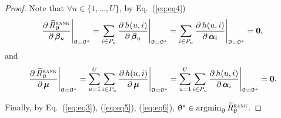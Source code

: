 \begin{proof}
Note that $\forall u \in \{1,\dots,U\}$,
by Eq.~(\ref{eq:eq4})
\begin{equation}
\label{eq:eq5}
\frac{\partial \, \widetilde R_{\uptheta}^{\textsc{rank}}} {\partial \, {\bm{\beta}}_u} \Bigg|_{\uptheta = \uptheta^*} 
= \sum_{i \in P_u} \frac{\partial \, h(u, i)}{\partial \, {\bm{\beta}}_u}  \Bigg|_{\uptheta = \uptheta^*}
= \sum_{i \in P_u} \frac{\partial \, h(u, i)}{\partial \, {\bm{\alpha}}_i} \Bigg|_{\uptheta = \uptheta^*}
= \mathbf{0},
\end{equation}
and
\begin{equation}
\label{eq:eq6}
\frac{\partial \, \widetilde R_{\uptheta}^{\textsc{rank}}} {\partial \, \bm{\mu}} \Bigg|_{\uptheta = \uptheta^*} 
= \sum_{u=1}^U \sum_{i \in P_u} \frac{\partial \, h(u, i)}{\partial \, \bm{\mu}} \Bigg|_{\uptheta = \uptheta^*}
= \sum_{u=1}^U \sum_{i \in P_u} \frac{\partial \, h(u, i)}{\partial \, {\bm{\alpha}}_i} \Bigg|_{\uptheta = \uptheta^*}
= \mathbf{0}.
\end{equation}

Finally, by Eq.~(\ref{eq:eq3}), (\ref{eq:eq5}), (\ref{eq:eq6}), $\uptheta^* \in \operatorname*{argmin}_{\uptheta} \widetilde R_{\uptheta}^{\textsc{rank}}$.

\end{proof}
